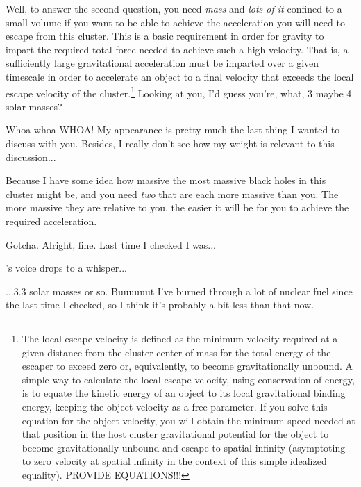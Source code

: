 \documentclass[main.tex]{subfiles}
\begin{document}
\par \Enrico Well, to answer the second question, you need \textit{mass} and \textit{lots of it} confined to a small volume if you want to be able to achieve the acceleration you will need to escape from this cluster.  This is a basic requirement in order for gravity to impart the required total force needed to achieve such a high velocity.  That is, a sufficiently large gravitational acceleration must be imparted over a given timescale in order to accelerate an object to a final velocity that exceeds the local escape velocity of the cluster.\footnote{The local escape velocity is defined as the minimum velocity required at a given distance from the cluster center of mass for the total energy of the escaper to exceed zero or, equivalently, to become gravitationally unbound.  A simple way to calculate the local escape velocity, using conservation of energy, is to equate the kinetic energy of an object to its local gravitational binding energy, keeping the object velocity as a free parameter.  If you solve this equation for the object velocity, you will obtain the minimum speed needed at that position in the host cluster gravitational potential for the object to become gravitationally unbound and escape to spatial infinity (asymptoting to zero velocity at spatial infinity in the context of this simple idealized equality).  PROVIDE EQUATIONS!!!} Looking at you, I'd guess you're, what, 3 maybe 4 solar masses?

\par \Sterope Whoa whoa WHOA!  My appearance is pretty much the last thing I wanted to discuss with you.  Besides, I really don't see how my weight is relevant to this discussion...

\par \Enrico Because I have some idea how massive the most massive black holes in this cluster might be, and you need \textit{two} that are each more massive than you.  The more massive they are relative to you, the easier it will be for you to achieve the required acceleration.

\par \Sterope Gotcha.  Alright, fine.  Last time I checked I was...

\par \nar \rmsterope's voice drops to a whisper...

\par \Sterope ...3.3 solar masses or so.  Buuuuuut I've burned through a lot of nuclear fuel since the last time I checked, so I think it's probably a bit less than that now.  
\end{document}
